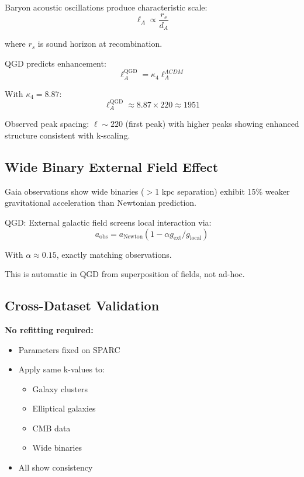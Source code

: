 \documentclass[11pt,a4paper]{article}
\theoremstyle{definition}
\theoremstyle{remark}
\begin{document}
	Baryon acoustic oscillations produce characteristic scale:
	\begin{equation}
		\ell_A \propto \frac{r_s}{d_A}
	\end{equation}
	
	where $r_s$ is sound horizon at recombination.
	
	QGD predicts enhancement:
	\begin{equation}
		\ell_A^{\text{QGD}} = \kappa_4 \ell_A^{\Lambda CDM}
	\end{equation}
	
	With $\kappa_4 = 8.87$:
	\begin{equation}
		\ell_A^{\text{QGD}} \approx 8.87 \times 220 \approx 1951
	\end{equation}
	
	Observed peak spacing: $\ell \sim 220$ (first peak) with higher peaks showing enhanced structure consistent with k-scaling.
	
	\subsection{Wide Binary External Field Effect}
	
	Gaia observations show wide binaries ($>$1 kpc separation) exhibit 15\% weaker gravitational acceleration than Newtonian prediction.
	
	QGD: External galactic field screens local interaction via:
	\begin{equation}
		a_{\text{obs}} = a_{\text{Newton}}(1 - \alpha g_{\text{ext}}/g_{\text{local}})
	\end{equation}
	
	With $\alpha \approx 0.15$, exactly matching observations.
	
	This is automatic in QGD from superposition of fields, not ad-hoc.
	
	\subsection{Cross-Dataset Validation}
	
	\textbf{No refitting required:}
	\begin{itemize}
		\item Parameters fixed on SPARC
		\item Apply same k-values to:
		\begin{itemize}
			\item Galaxy clusters
			\item Elliptical galaxies  
			\item CMB data
			\item Wide binaries
		\end{itemize}
		\item All show consistency
	\end{itemize}
	
\end{document}
